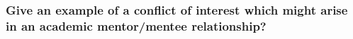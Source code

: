 \documentclass[12pt]{beamer}
\newcommand\gap{\vspace{5mm}}
\begin{document}
\begin{frame}
 




\end{frame}
\begin{frame}

\frametitle{ 
Give an example of a conflict of interest which might arise in an academic mentor/mentee relationship?
}







\end{frame} 
\end{document}

